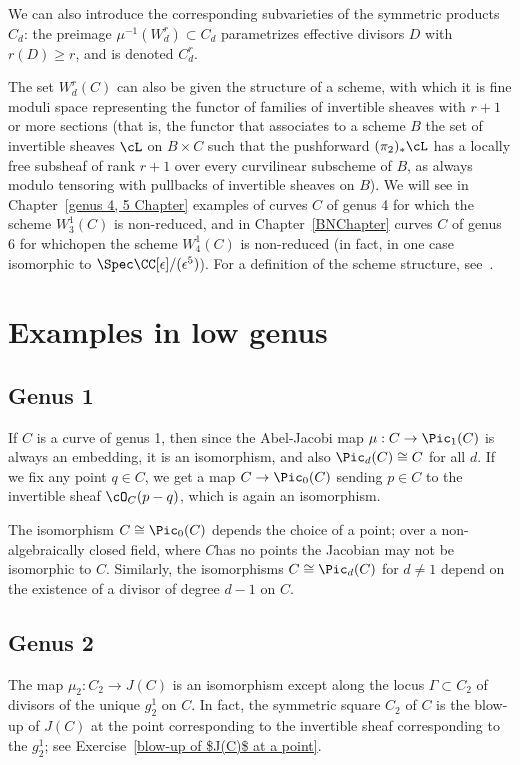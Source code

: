 We can also introduce the corresponding subvarieties of the symmetric products $C_d$: the preimage $\mu^{-1}(W^r_d) \subset C_d$ parametrizes effective divisors $D$ with $r(D) \geq r$, and is denoted $C^r_d$.

The set $W^r_d(C)$ can also be given the structure of a scheme, with which it is fine moduli space representing the functor of families of invertible sheaves with $r+1$ or more sections (that is, the functor that associates to a scheme $B$ the set of invertible sheaves $\cL$ on $B \times C$ such that the pushforward $(\pi_2)_*\cL$ has a locally free subsheaf of rank $r+1$ over every curvilinear subscheme of $B$, as always modulo tensoring with pullbacks of invertible sheaves on $B$). We will see in Chapter~\ref{genus 4, 5 Chapter} examples of curves $C$ of genus 4 for which the scheme $W^1_3(C)$ is non-reduced, and in Chapter~\ref{BNChapter} curves $C$ of genus 6 for whichopen the scheme $W^1_4(C)$ is non-reduced (in fact, in one case  isomorphic to $\Spec \CC[\epsilon]/(\epsilon^5)$). For a definition of the scheme structure, see~\cite[Section IV.3]{ACGH}. 

\section{Examples in low genus}

\subsection{Genus 1} 

If $C$ is a curve of genus 1, then since the Abel-Jacobi map $\mu : C \to \Pic_1(C)$ is always an embedding, it is an isomorphism, and also $\Pic_d(C) \cong C$ for all $d$. If we fix any point $q \in C$, we get a map $C \to \Pic_0(C)$ sending $p \in C$ to the invertible sheaf $\cO_C(p-q)$, which is again an isomorphism.

The isomorphism $C \cong \Pic_0(C)$  depends the choice of a point; over a non-algebraically closed field, where $C$has no points the Jacobian may not be isomorphic to $C$. Similarly, the isomorphisms $C \cong \Pic_d(C)$
for $d \neq 1$ depend on the existence of a divisor of degree $d-1$ on $C$.

\subsection{Genus 2}

The map $\mu_2 : C_{2} \to J(C)$ is an isomorphism except along the locus $\Gamma \subset  C_{2} $ of divisors of the unique $g^1_2$ on $C$. In fact, the symmetric square $ C_{2} $ of $C$ is the blow-up of $J(C)$ at the point corresponding to the invertible sheaf corresponding to the
$g^1_2$; see Exercise~\ref{blow-up of $J(C)$ at a point}.



